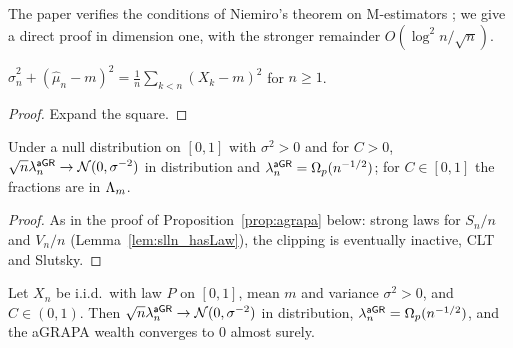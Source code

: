 \begin{remark}
  The paper verifies the conditions of Niemiro's theorem on M-estimators
  \cite{niemiro1992asymptotics}; we give a direct proof in dimension one, with the stronger
  remainder $O(\log^2 n / \sqrt n)$.
\end{remark}

\begin{lemma}
  \label{lem:empVar_add_sq}
  \leanok
  $\hat\sigma^2_n + (\hat\mu_n - m)^2 = \frac1n \sum_{k<n} (X_k - m)^2$ for $n \ge 1$.
\end{lemma}

\begin{proof}
  \leanok
  Expand the square.
\end{proof}

\begin{lemma}
  \label{lem:agrapa_clt}
  \leanok
  Under a null distribution on $[0,1]$ with $\sigma^2 > 0$ and for $C > 0$,
  $\sqrt n \lambda^{\mathsf{aGR}}_n \to \mathcal{N}(0, \sigma^{-2})$ in distribution and $\lambda^{\mathsf{aGR}}_n = \Omega_p(n^{-1/2})$; for
  $C \in [0,1]$ the fractions are in $\Lambda_m$.
\end{lemma}

\begin{proof}
  \leanok
  As in the proof of Proposition~\ref{prop:agrapa} below: strong laws for $S_n/n$ and $V_n/n$
  (Lemma~\ref{lem:slln_hasLaw}), the clipping is eventually inactive, CLT and Slutsky.
\end{proof}

\begin{proposition}
  \label{prop:agrapa}
  \leanok
  Let $X_n$ be i.i.d.\ with law $P$ on $[0,1]$, mean $m$ and variance $\sigma^2 > 0$, and
  $C \in (0,1)$. Then $\sqrt n \lambda^{\mathsf{aGR}}_n \to \mathcal{N}(0, \sigma^{-2})$ in distribution,
  $\lambda^{\mathsf{aGR}}_n = \Omega_p(n^{-1/2})$, and the aGRAPA wealth converges to $0$ almost surely.
\end{proposition}

